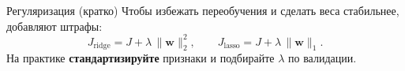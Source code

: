 \documentclass[11pt,aspectratio=169]{beamer}
\begin{document}
\begin{frame}{Регуляризация (кратко)}
	\small
	Чтобы избежать переобучения и сделать веса стабильнее, добавляют штрафы:
	\begin{equation*}
		J_{\text{ridge}} = J + \lambda\,\lVert\mathbf w\rVert_2^2, \qquad
		J_{\text{lasso}} = J + \lambda\,\lVert\mathbf w\rVert_1.
	\end{equation*}
	На практике \textbf{стандартизируйте} признаки и подбирайте \(\lambda\) по валидации.
\end{frame}
\end{document}
